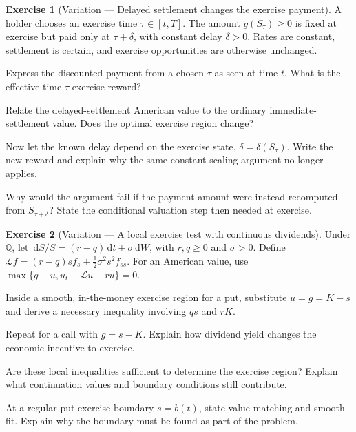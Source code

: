 \documentclass[11pt]{article}
\newcommand{\Qbb}{\mathbb Q}
\newcommand{\dd}{\,\mathrm d}
\theoremstyle{definition}
\newtheorem{exercise}{Exercise}[section]
\begin{document}
\begin{exercise}[Variation --- Delayed settlement changes the exercise payment]
A holder chooses an exercise time \(\tau\in[t,T]\). The amount
\(g(S_\tau)\geq0\) is fixed at exercise but paid only at
\(\tau+\delta\), with constant delay \(\delta>0\). Rates are constant,
settlement is certain, and exercise opportunities are otherwise unchanged.
\begin{exparts}
\item Express the discounted payment from a chosen \(\tau\) as seen at time \(t\). What is the effective time-\(\tau\) exercise reward?
\item Relate the delayed-settlement American value to the ordinary immediate-settlement value. Does the optimal exercise region change?
\item Now let the known delay depend on the exercise state, \(\delta=\delta(S_\tau)\). Write the new reward and explain why the same constant scaling argument no longer applies.
\item Why would the argument fail if the payment amount were instead recomputed from \(S_{\tau+\delta}\)? State the conditional valuation step then needed at exercise.
\end{exparts}
\end{exercise}

\begin{exercise}[Variation --- A local exercise test with continuous dividends]
Under \(\Qbb\), let
\(\dd S/S=(r-q)\dd t+\sigma\dd W\), with \(r,q\geq0\) and
\(\sigma>0\). Define
\(\mathcal L f=(r-q)s f_s+\tfrac12\sigma^2s^2f_{ss}\).
For an American value, use
\(\max\{g-u,u_t+\mathcal L u-ru\}=0\).
\begin{exparts}
\item Inside a smooth, in-the-money exercise region for a put, substitute \(u=g=K-s\) and derive a necessary inequality involving \(q s\) and \(rK\).
\item Repeat for a call with \(g=s-K\). Explain how dividend yield changes the economic incentive to exercise.
\item Are these local inequalities sufficient to determine the exercise region? Explain what continuation values and boundary conditions still contribute.
\item At a regular put exercise boundary \(s=b(t)\), state value matching and smooth fit. Explain why the boundary must be found as part of the problem.
\end{exparts}
\end{exercise}
\end{document}
